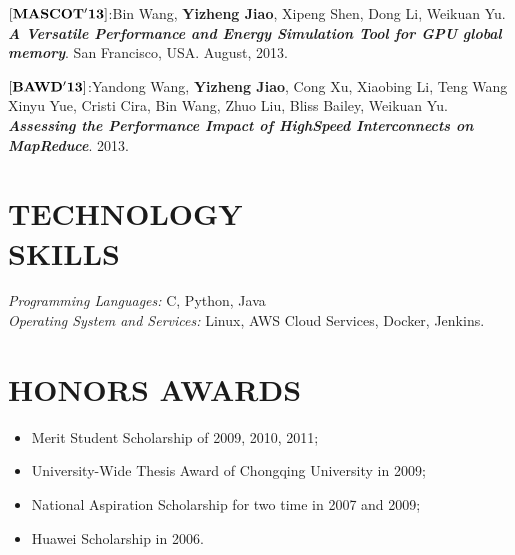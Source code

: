 \documentclass[margin, 10pt]{res} %
\begin{document}
\begin{resume}
$[\bf{MASCOT'13}]$:Bin Wang, \textbf{Yizheng Jiao}, Xipeng Shen, Dong Li, Weikuan Yu.
\textbf{\textit{A Versatile Performance and Energy Simulation Tool for GPU global memory}}.
San Francisco, USA. August, 2013.

$[\bf{BAWD'13}]$:Yandong Wang, \textbf{Yizheng Jiao}, Cong Xu, Xiaobing Li, Teng Wang Xinyu Yue, Cristi Cira, Bin Wang, Zhuo Liu, Bliss Bailey, Weikuan Yu. 
\textbf{\textit{Assessing the Performance Impact of HighSpeed Interconnects on MapReduce}}.
2013.





\section{TECHNOLOGY \\ SKILLS} 

{\sl Programming Languages:} C, Python, Java \\
{\sl Operating System and Services:} Linux, AWS Cloud Services, Docker, Jenkins. \\







\section{HONORS AWARDS} 
\begin{itemize}
\item Merit Student Scholarship of 2009, 2010, 2011;
\item University-Wide Thesis Award of Chongqing University in 2009;
\item National Aspiration Scholarship for two time in 2007 and 2009;
\item Huawei Scholarship in 2006.
\end{itemize}


\end{resume}
\end{document}
